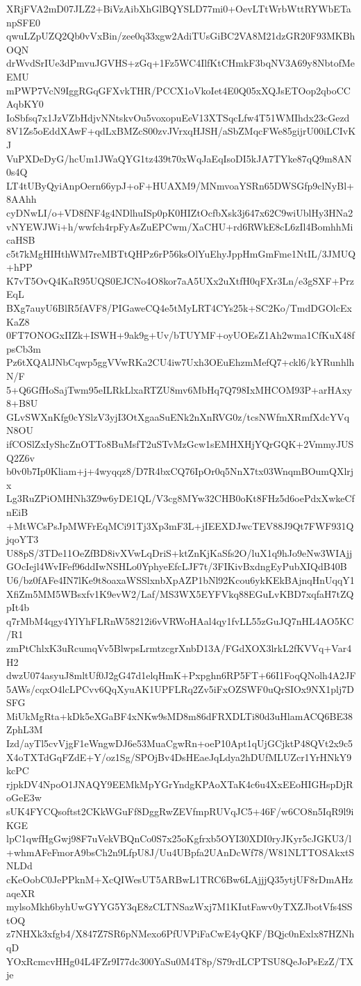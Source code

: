 XRjFVA2mD07JLZ2+BiVzAibXhGlBQYSLD77mi0+OevLTtWrbWttRYWbETanpSFE0
qwuLZpUZQ2Qb0vVxBin/zee0q33xgw2AdiTUsGiBC2VA8M21dzGR20F93MKBhOQN
drWvdSrIUe3dPmvuJGVHS+zGq+1Fz5WC4IlfKtCHmkF3bqNV3A69y8NbtofMeEMU
mPWP7VcN9IggRGqGFXvkTHR/PCCX1oVkoIet4E0Q05xXQJsETOop2qboCCAqbKY0
IoSbfsq7x1JzVZbHdjvNNtskvOu5voxopuEeV13XTSqcLfw4T51WMIhdx23cGezd
8V1Zs5oEddXAwF+qdLxBMZcS00zvJVrxqHJSH/aSbZMqcFWe85gijrU00iLCIvKJ
VuPXDeDyG/hcUm1JWaQYG1tz439t70xWqJaEqIsoDI5kJA7TYke87qQ9m8AN0s4Q
LT4tUByQyiAnpOern66ypJ+oF+HUAXM9/MNmvoaYSRn65DWSGfp9clNyBl+8AAhh
cyDNwLI/o+VD8fNF4g4NDlhuISp0pK0HIZtOcfbXsk3j647x62C9wiUblHy3HNa2
vNYEWJWi+h/wwfch4rpFyAsZuEPCwm/XaCHU+rd6RWkE8cL6zIl4BomhhMicaHSB
c5t7kMgHIHthWM7reMBTtQHPz6rP56ksOlYuEhyJppHmGmFme1NtIL/3JMUQ+hPP
K7vT5OvQ4KaR95UQS0EJCNo4O8kor7aA5UXx2uXtfH0qFXr3Ln/e3gSXF+PrzEqL
BXg7auyU6BlR5fAVF8/PIGaweCQ4e5tMyLRT4CYs25k+SC2Ko/TmdDGOlcExKaZ8
0FT7ONOGxIIZk+ISWH+9ak9g+Uv/bTUYMF+oyUOEsZ1Ah2wma1CfKuX48fpsCb3m
Pz6tXQAlJNbCqwp5ggVVwRKa2CU4iw7Uxh3OEuEhzmMefQ7+ckl6/kYRunhlhN/F
5+Q6GfHoSajTwm95eILRkLlxaRTZU8mv6MbHq7Q798IxMHCOM93P+arHAxy8+B8U
GLvSWXnKfg0cYSlzV3yjI3OtXgaaSuENk2nXnRVG0z/tcsNWfmXRmfXdcYVqN8OU
ifCOSlZxIyShcZnOTTo8BuMsfT2uSTvMzGcw1sEMHXHjYQrGQK+2VmmyJUSQ2Z6v
b0v0b7Ip0Kliam+j+4wyqqz8/D7R4bxCQ76IpOr0q5NnX7tx03WnqmBOumQXlrjx
Lg3RuZPiOMHNh3Z9w6yDE1QL/V3cg8MYw32CHB0oKt8FHz5d6oePdxXwkeCfnEiB
+MtWCsPsJpMWFrEqMCi91Tj3Xp3mF3L+jIEEXDJwcTEV88J9Qt7FWF931QjqoYT3
U88pS/3TDe11OeZfBD8ivXVwLqDriS+ktZnKjKaSfs2O/luX1q9hJo9eNw3WIAjj
GOcIejl4WvIFef96ddIwNSHLo0YphyeEfcLJF7t/3FIKivBxdngEyPubXIQdB40B
U6/bz0fAFe4IN7lKe9t8oaxaWSSlxnbXpAZP1bNl92Kcou6ykKEkBAjnqHnUqqY1
XfiZm5MM5WBsxfv1K9evW2/Laf/MS3WX5EYFVkq88EGuLvKBD7xqfaH7tZQpIt4b
q7rMbM4qgy4YlYhFLRnW58212i6vVRWoHAal4qy1fvLL55zGuJQ7nHL4AO5KC/R1
zmPtChlxK3uRcumqVv5BlwpsLrmtzcgrXnbD13A/FGdXOX3lrkL2fKVVq+Var4H2
dwzU074asyuJ8mltUf0J2gG47d1elqHmK+Pxpghn6RP5FT+66I1FoqQNolh4A2JF
5AWs/cqxO4lcLPCvv6QqXyuAK1UPFLRq2Zv5iFxOZSWF0uQrSIOx9NX1plj7DSFG
MiUkMgRta+kDk5eXGaBF4xNKw9sMD8m86dFRXDLTi80d3uHlamACQ6BE38ZphL3M
Izd/ayTl5cvVjgF1eWngwDJ6e53MuaCgwRn+oeP10Apt1qUjGCjktP48QVt2x9c5
X4oTXTdGqFZdE+Y/oz1Sg/SPOjBv4DsHEaeJqLdya2hDUfMLUZcr1YrHNkY9kcPC
rjpkDV4NpoO1JNAQY9EEMkMpYGrYndgKPAoXTaK4c6u4XxEEoHIGHspDjRoGeE3w
sUK4FYCQsoftst2CKkWGuFf8DggRwZEVfmpRUVqJC5+46F/w6CO8n5IqR9l9iKGE
lpC1qwfHgGwj98F7uVekVBQnCo0S7x25oKgfrxb5OYI30XDI0ryJKyr5cJGKU3/l
+whmAFeFmorA9bsCh2n9LfpU8J/Uu4UBpfa2UAnDcWf78/W81NLTTOSAkxtSNLDd
cKeOobC0JePPknM+XcQIWesUT5ARBwL1TRC6Bw6LAjjjQ35ytjUF8rDmAHzaqeXR
mylsoMkh6byhUwGYYG5Y3qE8zCLTNSazWxj7M1KIutFawv0yTXZJbotVfs4SStOQ
z7NHXk3xfgb4/X847Z7SR6pNMexo6PfUVPiFaCwE4yQKF/BQjc0nExlx87HZNhqD
YOxRcmcvHHg04L4FZr9I77dc300YaSu0M4T8p/S79rdLCPTSU8QeJoPsEzZ/TXje
